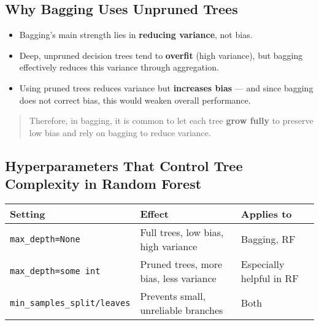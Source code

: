 \documentclass[
  letterpaper,
  DIV=11,
  numbers=noendperiod]{scrreprt}
\providecommand{\tightlist}{%
  \setlength{\itemsep}{0pt}\setlength{\parskip}{0pt}}\usepackage{longtable,booktabs,array}
\begin{document}
\subsection{Why Bagging Uses Unpruned
Trees}\label{why-bagging-uses-unpruned-trees}

\begin{itemize}
\tightlist
\item
  Bagging's main strength lies in \textbf{reducing variance}, not bias.
\item
  Deep, unpruned decision trees tend to \textbf{overfit} (high
  variance), but bagging effectively reduces this variance through
  aggregation.
\item
  Using pruned trees reduces variance but \textbf{increases bias} ---
  and since bagging does not correct bias, this would weaken overall
  performance.
\end{itemize}

\begin{quote}
Therefore, in bagging, it is common to let each tree \textbf{grow fully}
to preserve low bias and rely on bagging to reduce variance.
\end{quote}

\subsection{Hyperparameters That Control Tree Complexity in Random
Forest}\label{hyperparameters-that-control-tree-complexity-in-random-forest}

\begin{longtable}[]{@{}
  >{\raggedright\arraybackslash}p{}
  >{\raggedright\arraybackslash}p{}
  >{\raggedright\arraybackslash}p{}@{}}
\toprule\noalign{}
\begin{minipage}[b]{\linewidth}\raggedright
Setting
\end{minipage} & \begin{minipage}[b]{\linewidth}\raggedright
Effect
\end{minipage} & \begin{minipage}[b]{\linewidth}\raggedright
Applies to
\end{minipage} \\
\midrule\noalign{}
\endhead
\bottomrule\noalign{}
\endlastfoot
\texttt{max\_depth=None} & Full trees, low bias, high variance &
Bagging, RF \\
\texttt{max\_depth=some\ int} & Pruned trees, more bias, less variance &
Especially helpful in RF \\
\texttt{min\_samples\_split/leaves} & Prevents small, unreliable
branches & Both \\
\end{longtable}
\end{document}
